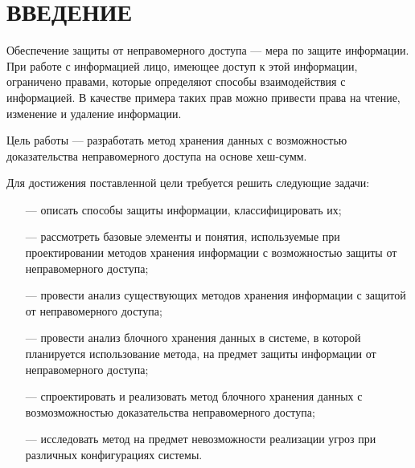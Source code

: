 


\normalsize
\setcounter{page}{3}

\pagebreak

\tableofcontents
\normalsize

\pagebreak


\section*{ВВЕДЕНИЕ}

Обеспечение защиты от неправомерного доступа --- мера по защите информации. При работе с информацией лицо, имеющее доступ к этой информации, ограничено правами, которые определяют способы взаимодействия с информацией. В качестве примера таких прав можно привести права на чтение, изменение и удаление информации.

Цель работы --- разработать метод хранения данных с возможностью доказательства неправомерного доступа на основе хеш-сумм.

Для достижения поставленной цели требуется решить следующие задачи:
\begin{itemize}
	\item [---] описать способы защиты информации, классифицировать их;
	\item [---] рассмотреть базовые элементы и понятия, используемые при проектировании методов хранения информации с возможностью защиты от неправомерного доступа;
	\item [---] провести анализ существующих методов хранения информации с защитой от неправомерного доступа;
	\item [---] провести анализ блочного хранения данных в системе, в которой планируется использование метода, на предмет защиты информации от неправомерного доступа;
	\item [---] спроектировать и реализовать метод блочного хранения данных с возмозможностью доказательства неправомерного доступа;
	\item [---] исследовать метод на предмет невозможности реализации угроз при различных конфигурациях системы.
\end{itemize}
\pagebreak

